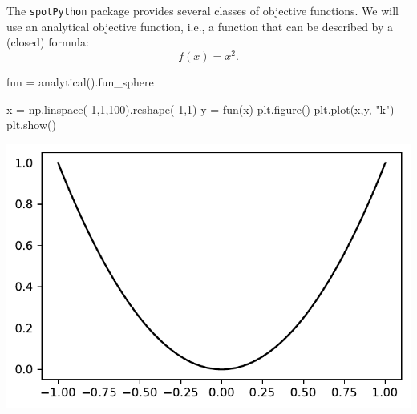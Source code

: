 \documentclass[
  letterpaper,
  DIV=11,
  numbers=noendperiod]{scrreprt}
\newenvironment{Shaded}{\begin{snugshade}}{\end{snugshade}}
\newcommand{\DecValTok}[1]{\textcolor[rgb]{0.68,0.00,0.00}{#1}}
\newcommand{\NormalTok}[1]{\textcolor[rgb]{0.00,0.23,0.31}{#1}}
\newcommand{\OperatorTok}[1]{\textcolor[rgb]{0.37,0.37,0.37}{#1}}
\newcommand{\StringTok}[1]{\textcolor[rgb]{0.13,0.47,0.30}{#1}}
\begin{document}
The \texttt{spotPython} package provides several classes of objective
functions. We will use an analytical objective function, i.e., a
function that can be described by a (closed) formula: \[
f(x) = x^2.
\]

\begin{Shaded}
\begin{Highlighting}[]
\NormalTok{fun }\OperatorTok{=}\NormalTok{ analytical().fun\_sphere}
\end{Highlighting}
\end{Shaded}

\begin{Shaded}
\begin{Highlighting}[]
\NormalTok{x }\OperatorTok{=}\NormalTok{ np.linspace(}\OperatorTok{{-}}\DecValTok{1}\NormalTok{,}\DecValTok{1}\NormalTok{,}\DecValTok{100}\NormalTok{).reshape(}\OperatorTok{{-}}\DecValTok{1}\NormalTok{,}\DecValTok{1}\NormalTok{)}
\NormalTok{y }\OperatorTok{=}\NormalTok{ fun(x)}
\NormalTok{plt.figure()}
\NormalTok{plt.plot(x,y, }\StringTok{"k"}\NormalTok{)}
\NormalTok{plt.show()}
\end{Highlighting}
\end{Shaded}

\includegraphics{a_04_spot_doc_files/figure-pdf/cell-4-output-1.pdf}
\end{document}
